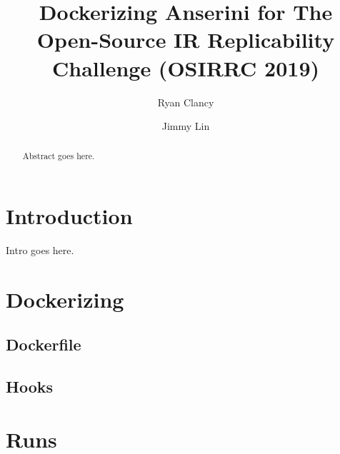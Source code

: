 \documentclass[sigconf]{acmart}
\begin{document}
  \title{Dockerizing Anserini for The Open-Source IR Replicability Challenge (OSIRRC 2019)}

  \author{Ryan Clancy}

  \author{Jimmy Lin}

  \renewcommand{\shortauthors}{R. Clancy and J. Lin}

  \begin{abstract}
    Abstract goes here.
  \end{abstract}


  \maketitle

  \section{Introduction}

    Intro goes here.

  \section{Dockerizing}
  \subsection{Dockerfile}
  \subsection{Hooks}

  \section{Runs}

  
  
\end{document}
